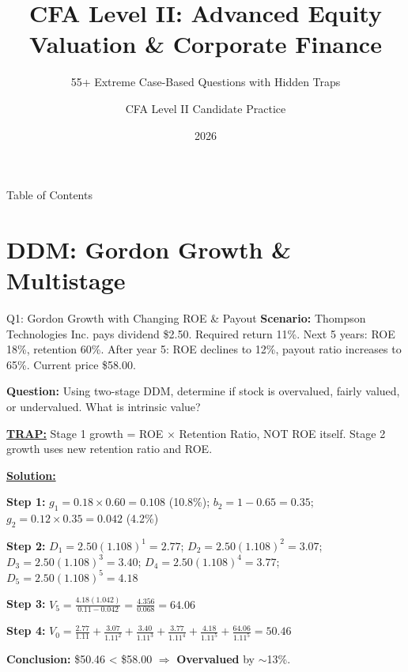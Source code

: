 \documentclass{beamer}
\title{CFA Level II: Advanced Equity Valuation \& Corporate Finance}
\subtitle{55+ Extreme Case-Based Questions with Hidden Traps}
\author{CFA Level II Candidate Practice}
\date{2026}
\renewcommand{\scriptsize}{\fontsize{6pt}{7pt}\selectfont}
\renewcommand{\footnotesize}{\fontsize{7pt}{8pt}\selectfont}
\begin{document}
	
	\begin{frame}
		\titlepage
	\end{frame}
	
	\begin{frame}{Table of Contents}
		\footnotesize
		\tableofcontents
	\end{frame}
	
	
	\section{DDM: Gordon Growth \& Multistage}
	
	\begin{frame}{Q1: Gordon Growth with Changing ROE \& Payout}
		\scriptsize
		\textbf{Scenario:} Thompson Technologies Inc. pays dividend \$2.50. Required return 11\%. Next 5 years: ROE 18\%, retention 60\%. After year 5: ROE declines to 12\%, payout ratio increases to 65\%. Current price \$58.00.
		
		\textbf{Question:} Using two-stage DDM, determine if stock is overvalued, fairly valued, or undervalued. What is intrinsic value?
		
		\vspace{2pt}
		\underline{\textbf{TRAP:}} Stage 1 growth = ROE × Retention Ratio, NOT ROE itself. Stage 2 growth uses new retention ratio and ROE.
		
		\vspace{4pt}
		\underline{\textbf{Solution:}}
		
		\textbf{Step 1:} $g_1 = 0.18 \times 0.60 = 0.108$ (10.8\%); $b_2 = 1 - 0.65 = 0.35$; $g_2 = 0.12 \times 0.35 = 0.042$ (4.2\%)
		
		\textbf{Step 2:} $D_1 = 2.50(1.108)^1 = 2.77$; $D_2 = 2.50(1.108)^2 = 3.07$; $D_3 = 2.50(1.108)^3 = 3.40$; $D_4 = 2.50(1.108)^4 = 3.77$; $D_5 = 2.50(1.108)^5 = 4.18$
		
		\textbf{Step 3:} $V_5 = \frac{4.18(1.042)}{0.11-0.042} = \frac{4.356}{0.068} = 64.06$
		
		\textbf{Step 4:} $V_0 = \frac{2.77}{1.11} + \frac{3.07}{1.11^2} + \frac{3.40}{1.11^3} + \frac{3.77}{1.11^4} + \frac{4.18}{1.11^5} + \frac{64.06}{1.11^5} = 50.46$
		
		\textbf{Conclusion:} \$50.46 < \$58.00 $\Rightarrow$ \textbf{Overvalued} by $\sim$13\%.
	\end{frame}
	
\end{document}
